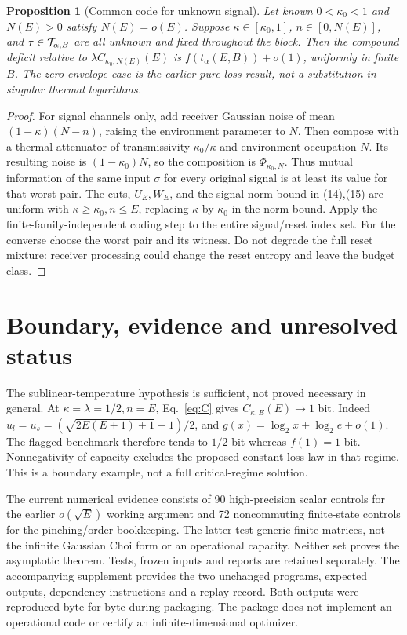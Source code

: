 \documentclass[11pt]{article}
\newtheorem{proposition}[theorem]{Proposition}
\begin{document}
\begin{proposition}[Common code for unknown signal]\label{prop:unknown}
Let known \(0<\kappa_0<1\) and \(N(E)>0\) satisfy \(N(E)=o(E)\).
Suppose \(\kappa\in[\kappa_0,1]\), \(n\in[0,N(E)]\), and
\(\tau\in{\cal T}_{\alpha,B}\) are all unknown and fixed throughout
the block. Then the compound deficit relative to
\(\lambda C_{\kappa_0,N(E)}(E)\) is \(f(t_\alpha(E,B))+o(1)\),
uniformly in finite \(B\). The zero-envelope case is the earlier
pure-loss result, not a substitution in singular thermal logarithms.
\end{proposition}
\begin{proof}
For signal channels only, add receiver Gaussian noise of mean
\((1-\kappa)(N-n)\), raising the environment parameter to \(N\).
Then compose with a thermal attenuator of transmissivity
\(\kappa_0/\kappa\) and environment occupation \(N\).
Its resulting noise is \((1-\kappa_0)N\), so the composition is
\(\Phi_{\kappa_0,N}\).
Thus mutual information of the same input \(\sigma\) for every original
signal is at least its value for that worst pair.
The cuts, \(U_E,W_E\), and the signal-norm bound in (14),(15) are
uniform with \(\kappa\ge\kappa_0,n\le E\), replacing \(\kappa\) by
\(\kappa_0\) in the norm bound. Apply the finite-family-independent
coding step to the entire signal/reset index set.
For the converse choose the worst pair and its witness.
Do not degrade the full reset mixture: receiver processing could change
the reset entropy and leave the budget class.
\end{proof}

\section{Boundary, evidence and unresolved status}
The sublinear-temperature hypothesis is sufficient, not proved
necessary in general. At \(\kappa=\lambda=1/2,n=E\), Eq.~\eqref{eq:C}
gives \(C_{\kappa,E}(E)\to1\) bit.
Indeed \(u_l=u_s=(\sqrt{2E(E+1)+1}-1)/2\), and
\(g(x)=\log_2x+\log_2e+o(1)\).
The flagged benchmark therefore tends to \(1/2\) bit whereas
\(f(1)=1\) bit. Nonnegativity of capacity excludes the proposed constant
loss law in that regime. This is a boundary example, not a full
critical-regime solution.

The current numerical evidence consists of 90 high-precision scalar
controls for the earlier \(o(\sqrt E)\) working argument and 72
noncommuting finite-state controls for the pinching/order bookkeeping.
The latter test generic finite matrices, not the infinite Gaussian Choi
form or an operational capacity. Neither set proves the asymptotic
theorem. Tests, frozen inputs and reports are retained separately.
The accompanying supplement provides the two unchanged programs,
expected outputs, dependency instructions and a replay record.
Both outputs were reproduced byte for byte during packaging.
The package does not implement an operational code or certify an
infinite-dimensional optimizer.
\end{document}
